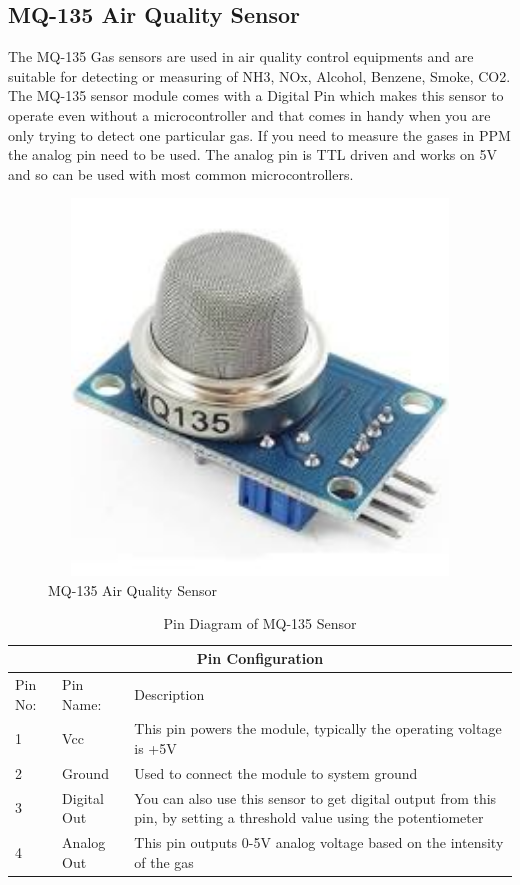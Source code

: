 \subsection{MQ-135 Air Quality Sensor }

The MQ-135 Gas sensors are used in air quality control equipments and are suitable for detecting or measuring of NH3, NOx, Alcohol, Benzene, Smoke, CO2. The MQ-135 sensor module comes with a Digital Pin which makes this sensor to operate even without a microcontroller and that comes in handy when you are only trying to detect one particular gas.  If you need to measure the gases in PPM the analog pin need to be used. The analog pin is TTL driven and works on 5V and so can be used with most common microcontrollers.

 \begin{figure}[!ht]
\centering
\includegraphics[width=12cm,height=10cm]{figures/mq-135.jpeg}
\caption{\label{img311} MQ-135 Air Quality Sensor}
\end{figure} 
 
 \begin{table}[!ht]
\centering
\begin{tabular}{ |p{1cm}|p{2cm}|p{8cm}|  }
\hline
\multicolumn{3}{|c|}{Pin Configuration} \\
\hline
Pin No: & Pin Name: & Description \\
\hline
1 & Vcc  & This pin powers the module, typically the operating voltage is +5V\\
2 & Ground & Used to connect the module to system ground\\
3 & Digital Out & You can also use this sensor to get digital output from this pin, by setting a threshold value using the potentiometer\\
4 & Analog Out & This pin outputs 0-5V analog voltage based on the intensity of the gas \\
\hline
\end{tabular}
\caption{\label{mq-135pin}Pin Diagram of MQ-135 Sensor}
\end{table}
 
